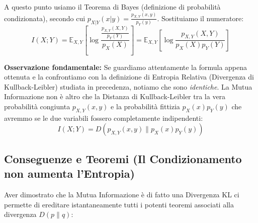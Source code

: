 A questo punto usiamo il Teorema di Bayes (definizione di probabilità condizionata), secondo cui $p_{X|Y}(x|y) = \frac{p_{X,Y}(x,y)}{p_Y(y)}$. Sostituiamo il numeratore:
\begin{equation}
    I(X;Y) = \mathbb{E}_{X,Y} \left[ \log \frac{\frac{p_{X,Y}(X,Y)}{p_Y(Y)}}{p_X(X)} \right] = \mathbb{E}_{X,Y} \left[ \log \frac{p_{X,Y}(X,Y)}{p_X(X)p_Y(Y)} \right]
\end{equation}

\textbf{Osservazione fondamentale:} Se guardiamo attentamente la formula appena ottenuta e la confrontiamo con la definizione di Entropia Relativa (Divergenza di Kullback-Leibler) studiata in precedenza, notiamo che sono \textit{identiche}. 
La Mutua Informazione non è altro che la Distanza di Kullback-Leibler tra la vera probabilità congiunta $p_{X,Y}(x,y)$ e la probabilità fittizia $p_X(x)p_Y(y)$ che avremmo se le due variabili fossero completamente indipendenti:
\begin{equation}
    \boxed{ I(X;Y) = D( p_{X,Y}(x,y) \parallel p_X(x)p_Y(y) ) }
\end{equation}

\subsection{Conseguenze e Teoremi (Il Condizionamento non aumenta l'Entropia)}

Aver dimostrato che la Mutua Informazione è di fatto una Divergenza KL ci permette di ereditare istantaneamente tutti i potenti teoremi associati alla divergenza $D(p \parallel q)$:

